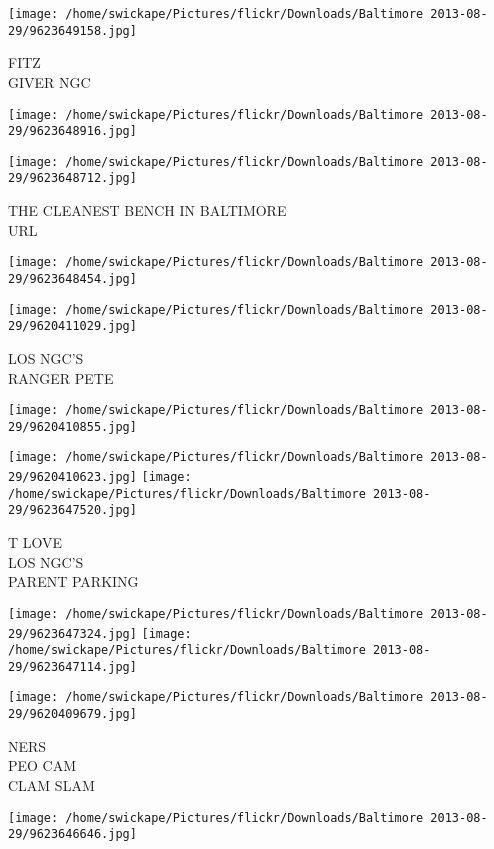 \documentclass[10pt,letterpaper]{article}
\begin{document}
\vspace{0.25in}
\texttt{[image: /home/swickape/Pictures/flickr/Downloads/Baltimore 2013-08-29/9623649158.jpg]}

FITZ\\
GIVER NGC
\pagebreak

\texttt{[image: /home/swickape/Pictures/flickr/Downloads/Baltimore 2013-08-29/9623648916.jpg]}

\vspace{0.25in}
\texttt{[image: /home/swickape/Pictures/flickr/Downloads/Baltimore 2013-08-29/9623648712.jpg]}

THE CLEANEST BENCH IN BALTIMORE\\
URL
\pagebreak

\texttt{[image: /home/swickape/Pictures/flickr/Downloads/Baltimore 2013-08-29/9623648454.jpg]}

\vspace{0.25in}
\texttt{[image: /home/swickape/Pictures/flickr/Downloads/Baltimore 2013-08-29/9620411029.jpg]}

LOS NGC'S\\
RANGER PETE
\pagebreak

\texttt{[image: /home/swickape/Pictures/flickr/Downloads/Baltimore 2013-08-29/9620410855.jpg]}

\vspace{0.25in}
\texttt{[image: /home/swickape/Pictures/flickr/Downloads/Baltimore 2013-08-29/9620410623.jpg]}
\texttt{[image: /home/swickape/Pictures/flickr/Downloads/Baltimore 2013-08-29/9623647520.jpg]}

T LOVE\\
LOS NGC'S\\
PARENT PARKING
\pagebreak

\texttt{[image: /home/swickape/Pictures/flickr/Downloads/Baltimore 2013-08-29/9623647324.jpg]}
\texttt{[image: /home/swickape/Pictures/flickr/Downloads/Baltimore 2013-08-29/9623647114.jpg]}

\vspace{0.25in}
\texttt{[image: /home/swickape/Pictures/flickr/Downloads/Baltimore 2013-08-29/9620409679.jpg]}

NERS\\
PEO CAM\\
CLAM SLAM
\pagebreak

\texttt{[image: /home/swickape/Pictures/flickr/Downloads/Baltimore 2013-08-29/9623646646.jpg]}
\end{document}
